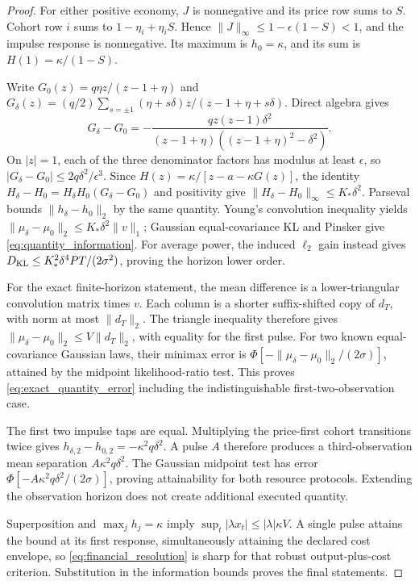 \begin{proof}
For either positive economy, $J$ is nonnegative and its price row sums to $S$. Cohort row $i$ sums to $1-\eta_i+\eta_i S$. Hence $\|J\|_\infty\le1-\epsilon(1-S)<1$, and the impulse response is nonnegative. Its maximum is $h_0=\kappa$, and its sum is $H(1)=\kappa/(1-S)$.

Write $G_0(z)=q\eta z/(z-1+\eta)$ and
$G_\delta(z)=(q/2)\sum_{s=\pm1}(\eta+s\delta)z/(z-1+\eta+s\delta)$.
Direct algebra gives
\[
G_\delta-G_0
=-\frac{qz(z-1)\delta^2}{(z-1+\eta)((z-1+\eta)^2-\delta^2)}.
\]
On $|z|=1$, each of the three denominator factors has modulus at least $\epsilon$, so $|G_\delta-G_0|\le2q\delta^2/\epsilon^3$. Since $H(z)=\kappa/[z-a-\kappa G(z)]$, the identity $H_\delta-H_0=H_\delta H_0(G_\delta-G_0)$ and positivity give
$\|H_\delta-H_0\|_\infty\le K_*\delta^2$.
Parseval bounds $\|h_\delta-h_0\|_2$ by the same quantity. Young's convolution inequality yields $\|\mu_\delta-\mu_0\|_2\le K_*\delta^2\|v\|_1$; Gaussian equal-covariance KL and Pinsker give \eqref{eq:quantity_information}. For average power, the induced $\ell_2$ gain instead gives $D_{\rm KL}\le K_*^2\delta^4PT/(2\sigma^2)$, proving the horizon lower order.

For the exact finite-horizon statement, the mean difference is a lower-triangular convolution matrix times $v$. Each column is a shorter suffix-shifted copy of $d_T$, with norm at most $\|d_T\|_2$. The triangle inequality therefore gives $\|\mu_\delta-\mu_0\|_2\le V\|d_T\|_2$, with equality for the first pulse. For two known equal-covariance Gaussian laws, their minimax error is $\Phi[-\|\mu_\delta-\mu_0\|_2/(2\sigma)]$, attained by the midpoint likelihood-ratio test. This proves \eqref{eq:exact_quantity_error} including the indistinguishable first-two-observation case.

The first two impulse taps are equal. Multiplying the price-first cohort transitions twice gives
$h_{\delta,2}-h_{0,2}=-\kappa^2q\delta^2$. A pulse $A$ therefore produces a third-observation mean separation $A\kappa^2q\delta^2$. The Gaussian midpoint test has error $\Phi[-A\kappa^2q\delta^2/(2\sigma)]$, proving attainability for both resource protocols. Extending the observation horizon does not create additional executed quantity.

Superposition and $\max_jh_j=\kappa$ imply $\sup_t|\lambda x_t|\le|\lambda|\kappa V$. A single pulse attains the bound at its first response, simultaneously attaining the declared cost envelope, so \eqref{eq:financial_resolution} is sharp for that robust output-plus-cost criterion. Substitution in the information bounds proves the final statements.
\end{proof}

